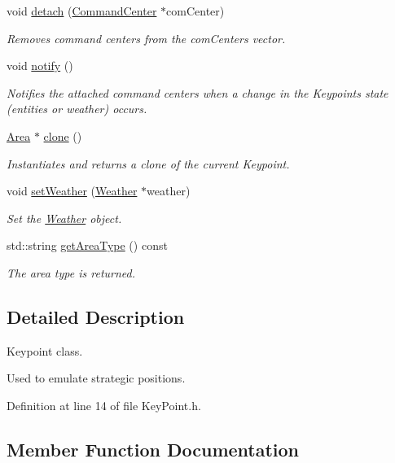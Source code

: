 \begin{DoxyCompactItemize}
void \hyperlink{classKeyPoint_aea6e2eca9de4d986c1350270d0e88401}{detach} (\hyperlink{classCommandCenter}{Command\+Center} $\ast$com\+Center)
\begin{DoxyCompactList}\small\item\em Removes command centers from the com\+Centers vector. \end{DoxyCompactList}\item 
void \hyperlink{classKeyPoint_a5b21817babe753b2b684d70479f3eaf2}{notify} ()
\begin{DoxyCompactList}\small\item\em Notifies the attached command centers when a change in the Keypoint\textquotesingle{}s state (entities or weather) occurs. \end{DoxyCompactList}\item 
\hyperlink{classArea}{Area} $\ast$ \hyperlink{classKeyPoint_adc4679ca31d34b0ae3fedded47e27938}{clone} ()
\begin{DoxyCompactList}\small\item\em Instantiates and returns a clone of the current Keypoint. \end{DoxyCompactList}\item 
void \hyperlink{classKeyPoint_a5c4b9314440a00fca7ab4d82ea4693a5}{set\+Weather} (\hyperlink{classWeather}{Weather} $\ast$weather)
\begin{DoxyCompactList}\small\item\em Set the \hyperlink{classWeather}{Weather} object. \end{DoxyCompactList}\item 
std\+::string \hyperlink{classKeyPoint_a2e7f0accc7c9be244da25bb1189c5a1d}{get\+Area\+Type} () const
\begin{DoxyCompactList}\small\item\em The area type is returned. \end{DoxyCompactList}\end{DoxyCompactItemize}


\subsection{Detailed Description}
Keypoint class. 

Used to emulate strategic positions. 

Definition at line 14 of file Key\+Point.\+h.



\subsection{Member Function Documentation}
\mbox{\label{classKeyPoint_aad6d7102c8e3d11fe5f29b163f50dbc3}} 
